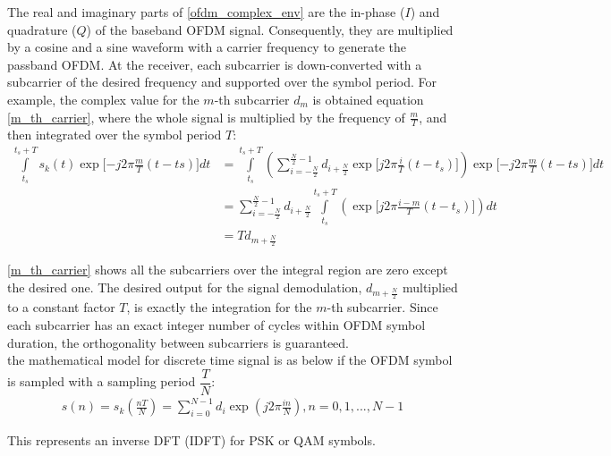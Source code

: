The real and imaginary parts of \ref{ofdm_complex_env} are the in-phase ($I$) and quadrature ($Q$) of the baseband OFDM signal. Consequently, they are multiplied by a cosine and a sine waveform with a carrier frequency to generate the passband OFDM. At the receiver, each subcarrier is down-converted with a subcarrier of the desired frequency and supported over the symbol period. For example, the complex value for the $m$-th subcarrier $d_{m}$ is obtained equation \ref{m_th_carrier}, where the whole signal is multiplied by the frequency of $\frac{m}{T}$, and then integrated over the symbol period $T$:
\begin{equation} \label{m_th_carrier}
\begin{split}
\int\limits_{t_{s}}^{t_{s} + T} s_{k}(t) \exp \lbrack -j2\pi \frac{m}{T} (t-ts) \rbrack dt & = \int\limits_{t_{s}}^{t_{s} + T}  \left( \sum\limits_{i=-\frac{N}{2}}^{\frac{N}{2}-1} d_{i+\frac{N}{2}} \exp\lbrack j2\pi\frac{i}{T}(t- t_{s})\rbrack\right) \exp \lbrack -j2\pi \frac{m}{T} (t-ts) \rbrack dt\\
& = \sum\limits_{i=-\frac{N}{2}}^{\frac{N}{2}-1} d_{i+\frac{N}{2}} \int\limits_{t_{s}}^{t_{s} + T}  \left( \exp\lbrack j2\pi\frac{i-m}{T}(t- t_{s})\rbrack\right) dt\\
& = Td_{m+ \frac{N}{2}}
\end{split}
\end{equation}

\ref{m_th_carrier} shows all the subcarriers over the integral region are zero except the desired one. The desired output for the signal demodulation, $d_{m+ \frac{N}{2}}$ multiplied to a constant factor $T$, is exactly the integration for the $m$-th subcarrier. Since each subcarrier has an exact integer number of cycles within OFDM symbol duration, the orthogonality between subcarriers is guaranteed.\\
the mathematical model for discrete time signal is as below if the OFDM symbol is sampled with a sampling period $\dfrac{T}{N}$:
\begin{equation} \label{math_model}
\begin{split}
s(n)= s_{k}(\frac{nT}{N})= \sum\limits_{i=0}^{N-1} d_{i} \exp(j2\pi\frac{in}{N}), n= 0, 1, ... , N-1
\end{split}
\end{equation}

This represents an inverse DFT (IDFT) for PSK or QAM symbols.\\

